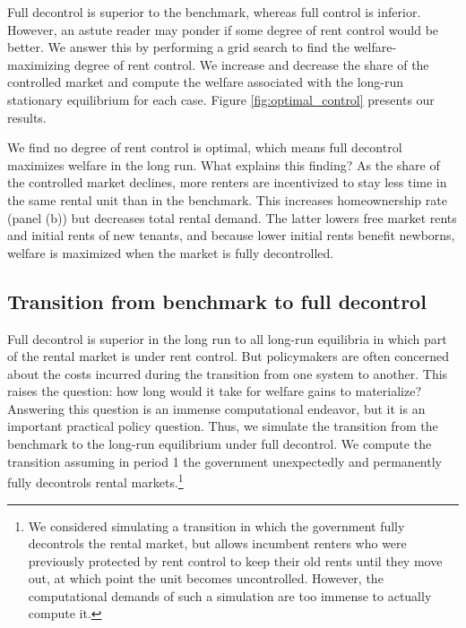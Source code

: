 \documentclass[parskip=full]{article}
\begin{document}
Full decontrol is superior to the benchmark, whereas full control is inferior. However, an astute reader may ponder if some degree of rent control would be better. We answer this by performing a grid search to find the welfare-maximizing degree of rent control. We increase and decrease the share of the controlled market and compute the welfare associated with the long-run stationary equilibrium for each case. Figure \ref{fig:optimal_control} presents our results.

We find no degree of rent control is optimal, which means full decontrol maximizes welfare in the long run. What explains this finding? As the share of the controlled market declines, more renters are incentivized to stay less time in the same rental unit than in the benchmark. This increases homeownership rate (panel (b)) but decreases total rental demand. The latter lowers free market rents and initial rents of new tenants, and because lower initial rents benefit newborns, welfare is maximized when the market is fully decontrolled.

\subsection{Transition from benchmark to full decontrol}\label{subsection:transition}

Full decontrol is superior in the long run to all long-run equilibria in which part of the rental market is under rent control. But policymakers are often concerned about the costs incurred during the transition from one system to another. This raises the question: how long would it take for welfare gains to materialize? Answering this question is an immense computational endeavor, but it is an important practical policy question. Thus, we simulate the transition from the benchmark to the long-run equilibrium under full decontrol. We compute the transition assuming in period 1 the government unexpectedly and permanently fully decontrols rental markets.\footnote{We considered simulating a transition in which the government fully decontrols the rental market, but allows incumbent renters who were previously protected by rent control to keep their old rents until they move out, at which point the unit becomes uncontrolled. However, the computational demands of such a simulation are too immense to actually compute it.}
\end{document}

